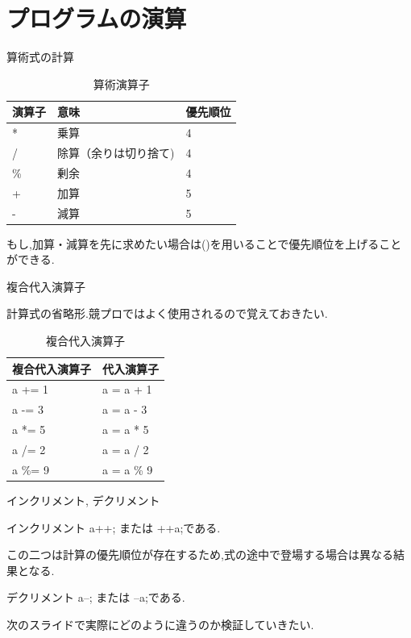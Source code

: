 \section{プログラムの演算}
\begin{frame}{算術式の計算}
    \begin{table}[]
        \centering
        \begin{tabular}{|l|l|l|}
            \hline
            演算子 & 意味 & 優先順位\\
            \hline
            * & 乗算 & 4\\
            / & 除算（余りは切り捨て) & 4\\
            \% & 剰余 & 4\\
            + & 加算 & 5\\
            - & 減算 & 5\\
            \hline
        \end{tabular}
        \caption{算術演算子}
        \label{tab:my_label}
    \end{table}
    \begin{block}{}
        もし,加算・減算を先に求めたい場合は()を用いることで優先順位を上げることができる.
    \end{block}
\end{frame}

\begin{frame}{複合代入演算子}
    \begin{block}{}
        計算式の省略形.競プロではよく使用されるので覚えておきたい.
    \end{block}
    \begin{table}[]
        \centering
        \begin{tabular}{|l|l|}
            \hline
            複合代入演算子 & 代入演算子 \\
            \hline
            a += 1 & a = a + 1\\
            a -= 3 & a = a - 3\\
            a *= 5 & a = a * 5\\
            a /= 2 & a = a / 2\\
            a \%= 9 & a = a \% 9\\
            \hline
        \end{tabular}
        \caption{複合代入演算子}
        \label{tab:my_label}
    \end{table}
\end{frame}

\begin{frame}{インクリメント, デクリメント}
    \begin{block}{インクリメント}
        a++; または ++a;である.
        
        この二つは計算の優先順位が存在するため,式の途中で登場する場合は異なる結果となる.
    \end{block}
    \begin{block}{デクリメント}
        a--; または --a;である.
    \end{block}
    次のスライドで実際にどのように違うのか検証していきたい.
\end{frame}


